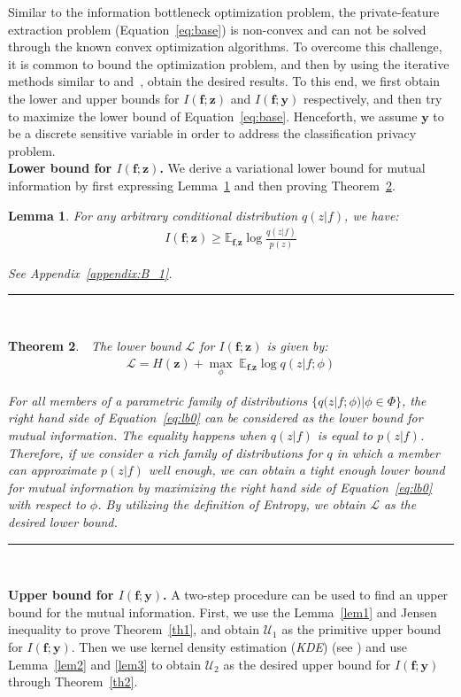 \documentclass[10pt,journal,compsoc]{IEEEtran}
\newcommand{\BlackBox}{\rule{1.5ex}{1.5ex}}  %
\newenvironment{proof}{\par\noindent{\bf Proof\ }}{\hfill\BlackBox\\[2mm]}
\newtheorem{theorem}{Theorem}
\newtheorem{lemma}[theorem]{Lemma}
\begin{document}
Similar to the information bottleneck optimization problem, the private-feature extraction problem (Equation~\ref{eq:base}) is non-convex and can not be solved through the known convex optimization algorithms. To overcome this challenge, it is common to bound the optimization problem, and then by using the iterative methods similar to \cite{barber2003} and~\cite{alemi2016}, obtain the desired results. To this end, we first obtain the lower and upper bounds for $I(\textbf{f};\textbf{z})$ and $I(\textbf{f};\textbf{y})$ respectively, and then try to maximize the lower bound of Equation~\ref{eq:base}. Henceforth, we assume $\textbf{y}$ to be a discrete sensitive variable in order to address the classification privacy problem.\\

\textbf{Lower bound for $I(\textbf{f};\textbf{z})$.} We derive a variational lower bound for mutual information by first expressing Lemma~\ref{lem0} and then proving Theorem~\ref{th0}.
\begin{lemma}
	\label{lem0}
	For any arbitrary conditional distribution $q(z|f)$, we have:
	\begin{align}\label{eq:lb0}
	I(\textbf{f};\textbf{z}) \geq \mathds{E}_{\textbf{f},\textbf{z}} \log \frac{q(z|f)}{p(z)}
	\end{align}
	\begin{proof}
		See Appendix~\ref{appendix:B_1}.
	\end{proof}
\end{lemma}\begin{theorem} \label{th0}
	$\;$ The lower bound $\mathcal{L}$ for $I(\textbf{f};\textbf{z})$ is given by:
	\begin{align}
	\mathcal{L} =  H(\textbf{z}) + \max_{\phi}\; \mathds{E}_{\textbf{f},\textbf{z}} \log q(z|f;\phi)
	\end{align}
	\begin{proof}
		For all members of a parametric family of distributions $\{q(z|f;\phi)|\phi \in \Phi\}$, the right hand side of Equation~\ref{eq:lb0} can be considered as the lower bound for mutual information. The equality happens when $q(z|f)$ is equal to $p(z|f)$. Therefore, if we consider a rich family of distributions for $q$ in which a member can approximate $p(z|f)$ well enough, we can obtain a tight enough lower bound for mutual information by maximizing the right hand side of Equation~\ref{eq:lb0} with respect to $\phi$. By utilizing the definition of Entropy, we obtain $\mathcal{L}$ as the desired lower bound.
	\end{proof}
\end{theorem}\textbf{Upper bound for $I(\textbf{f};\textbf{y})$.} A two-step procedure can be used to find an upper bound for the mutual information. First, we use the Lemma~\ref{lem1} and Jensen inequality to prove Theorem~\ref{th1}, and obtain $\mathcal{U}_1$ as the primitive upper bound for $I(\textbf{f};\textbf{y})$. Then we use kernel density estimation (\emph{KDE}) (see \cite{bishop2006}) and use Lemma~\ref{lem2} and \ref{lem3} to obtain $\mathcal{U}_2$ as the desired upper bound for $I(\textbf{f};\textbf{y})$ through Theorem~\ref{th2}. 
\end{document}
